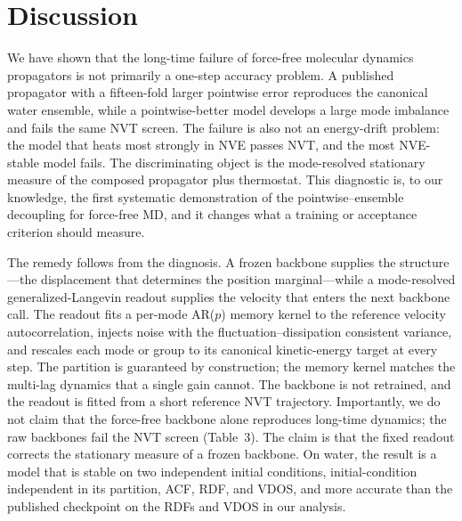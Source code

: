 \section{Discussion}

We have shown that the long-time failure of force-free molecular dynamics propagators is not
primarily a one-step accuracy problem. A published propagator with a fifteen-fold larger pointwise
error reproduces the canonical water ensemble, while a pointwise-better model develops a large mode
imbalance and fails the same NVT screen. The failure is also not an energy-drift problem: the model
that heats most strongly in NVE passes NVT, and the most NVE-stable model fails. The discriminating
object is the mode-resolved stationary measure of the composed propagator plus thermostat. This
diagnostic is, to our knowledge, the first systematic demonstration of the pointwise--ensemble
decoupling for force-free MD, and it changes what a training or acceptance criterion should
measure.

The remedy follows from the diagnosis. A frozen backbone supplies the structure---the displacement
that determines the position marginal---while a mode-resolved generalized-Langevin readout supplies
the velocity that enters the next backbone call. The readout fits a per-mode AR(\(p\)) memory
kernel to the reference velocity autocorrelation, injects noise with the fluctuation--dissipation
consistent variance, and rescales each mode or group to its canonical kinetic-energy target at every step.
The partition is guaranteed by construction; the memory kernel matches the multi-lag dynamics that
a single gain cannot. The backbone is not retrained, and the readout is fitted from a short
reference NVT trajectory. Importantly, we do not claim that the force-free backbone alone
reproduces long-time dynamics; the raw backbones fail the NVT screen (Table~3). The claim is that
the fixed readout corrects the stationary measure of a frozen backbone. On water, the result is a model that is stable on two independent initial
conditions, initial-condition independent in its partition, ACF, RDF, and VDOS, and more accurate
than the published checkpoint on the RDFs and VDOS in our analysis.



